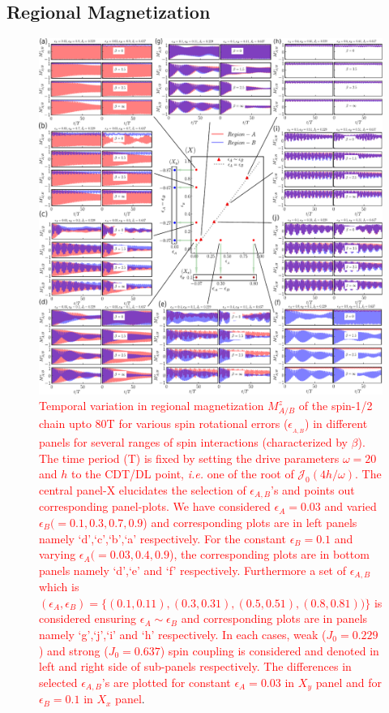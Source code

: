 \documentclass[12pt]{iopart}
\newcommand{\red}[1]{\textcolor{red}{#1}}
\begin{document}
\subsection{\label{sec:level42} Regional Magnetization}
\begin{figure}[t]
	\centering
	\includegraphics[width = 15.0cm]{figure8.pdf}
	\caption{\red{Temporal variation in regional magnetization $M^z_{A/B}$ of the spin-1/2 chain upto 80T for various spin rotational errors ($\epsilon_{_{A,B}}$) in different panels for  several ranges of spin interactions (characterized by $\beta$). The time period (T) is fixed by setting the drive parameters $\omega=20$ and $h$ to the CDT/DL point, \textit{i.e.} one of the root of $\mathcal{J}_0(4h/\omega)$. The central panel-X elucidates the selection of $\epsilon_{A,B}$'s and points out corresponding panel-plots. We have considered $\epsilon_A = 0.03$ and varied $\epsilon_B(= 0.1, 0.3, 0.7,0.9$) and corresponding plots are in left panels namely `d',`c',`b',`a' respectively.  For the constant $\epsilon_B = 0.1$ and varying $\epsilon_A ( = 0.03, 0.4,0.9$), the corresponding plots are in bottom panels namely `d',`e' and `f' respectively. Furthermore a set of $\epsilon_{A,B}$ which is $ (\epsilon_{A},\epsilon_{B}) = \{(0.1,0.11), (0.3,0.31),(0.5,0.51),(0.8,0.81))\}$ is considered ensuring $\epsilon_A\sim \epsilon_B$ and corresponding plots are in panels namely `g',`j',`i' and `h' respectively. In each cases, weak ($J_0 = 0.229$) and strong ($J_0 = 0.637$) spin coupling  is considered and denoted in left and right side of sub-panels respectively. The differences in selected $\epsilon_{A,B}$'s are plotted for constant $\epsilon_A = 0.03$ in $X_y$ panel and for $\epsilon_B = 0.1$ in $X_x$ panel}.}
	\label{Fig:reg_mag_ea_eb}
\end{figure}
\end{document}

